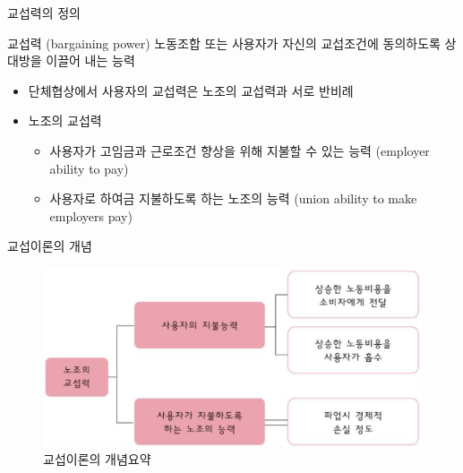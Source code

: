 \documentclass[aspectratio=169,xcolor=dvipsnames,handout]{beamer}
\begin{document}
\begin{frame}{교섭력의 정의}
    \begin{block}{교섭력 (bargaining power)}
        노동조합 또는 사용자가 자신의 교섭조건에 동의하도록 상대방을 이끌어 내는 능력
    \end{block}
    \begin{itemize}[<+->]
        \item 단체협상에서 사용자의 교섭력은 노조의 교섭력과 서로 반비례
        \item 노조의 교섭력
        \begin{itemize}[<+->]
            \item 사용자가 고임금과 근로조건 향상을 위해 지불할 수 있는 능력 (employer ability to pay)
            \item 사용자로 하여금 지불하도록 하는 노조의 능력 (union ability to make employers pay)
        \end{itemize}
    \end{itemize}
\end{frame}

\begin{frame}{교섭이론의 개념}
    \begin{figure}
        \centering
        \includegraphics[width=.8\textwidth]{pic/교섭이론의 개념요약.png}
        \caption{교섭이론의 개념요약}
    \end{figure}
\end{frame}
\end{document}
